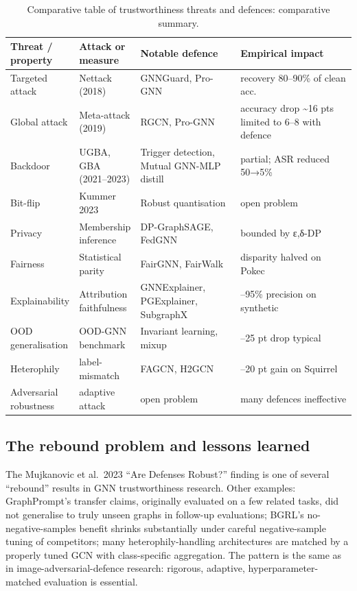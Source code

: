 \documentclass{article}
\begin{document}
\begin{table}[t]
\centering
\caption{Comparative table of trustworthiness threats and defences: comparative summary.}
\label{tab:comparative-table-of-trustworthiness-threats-and-defences}
\begin{tabular}{>{\raggedright\arraybackslash}p{0.1618\linewidth}
  >{\raggedright\arraybackslash}p{0.1765\linewidth}
  >{\raggedright\arraybackslash}p{0.3015\linewidth}
  >{\raggedright\arraybackslash}p{0.3603\linewidth}}
\toprule
Threat / property & Attack or measure & Notable defence & Empirical impact \\
\midrule
Targeted attack & Nettack (2018) & GNNGuard, Pro-GNN & recovery 80--90\% of clean acc. \\
Global attack & Meta-attack (2019) & RGCN, Pro-GNN & accuracy drop \textasciitilde16 pts limited to 6--8 with defence \\
Backdoor & UGBA, GBA (2021--2023) & Trigger detection, Mutual GNN-MLP distill & partial; ASR reduced 50→5\% \\
Bit-flip & Kummer 2023 & Robust quantisation & open problem \\
Privacy & Membership inference & DP-GraphSAGE, FedGNN & bounded by ε,δ-DP \\
Fairness & Statistical parity & FairGNN, FairWalk & disparity halved on Pokec \\
Explainability & Attribution faithfulness & GNNExplainer, PGExplainer, SubgraphX & 70--95\% precision on synthetic \\
OOD generalisation & OOD-GNN benchmark & Invariant learning, mixup & 5--25 pt drop typical \\
Heterophily & label-mismatch & FAGCN, H2GCN & 5--20 pt gain on Squirrel \\
Adversarial robustness & adaptive attack & open problem \citep{mujkanovic2023aredefensesforgrap} & many defences ineffective \\
\end{tabular}
\end{table}

\subsection{The rebound problem and lessons learned}\label{the-rebound-problem-and-lessons-learned}

The Mujkanovic et al.~2023 ``Are Defenses Robust?'' finding is one of several ``rebound'' results in GNN trustworthiness research. Other examples: GraphPrompt's transfer claims, originally evaluated on a few related tasks, did not generalise to truly unseen graphs in follow-up evaluations; BGRL's no-negative-samples benefit shrinks substantially under careful negative-sample tuning of competitors; many heterophily-handling architectures are matched by a properly tuned GCN with class-specific aggregation. The pattern is the same as in image-adversarial-defence research: rigorous, adaptive, hyperparameter-matched evaluation is essential.
\end{document}
